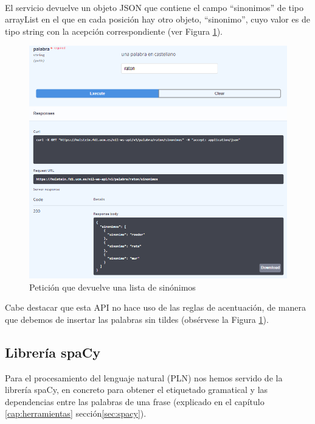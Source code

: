\begin{itemize}
\begin{lstlisting}[backgroundcolor = \color{pink},
	xleftmargin = 1cm,
	framexleftmargin = 1em,frame=tlbr,framesep=4pt,framerule=1pt]
	
\end{lstlisting}



El servicio devuelve un objeto JSON que contiene el campo ``sinonimos'' de tipo arrayList en el que en cada posición hay otro objeto, ``sinonimo'', cuyo valor es de tipo string con la acepción correspondiente (ver Figura \ref{fig:apiSinonimo}).
\begin{figure}[h!]
	\centering
	
	
	\includegraphics[scale=1]{Imagenes/Figuras/APISinonimos}
	
	
	\caption{Petición que devuelve una lista de sinónimos}
	\label{fig:apiSinonimo}
\end{figure}
\end{itemize}

Cabe destacar que esta API no hace uso de las reglas de acentuación, de manera que debemos de insertar las palabras sin tildes (obsérvese la Figura \ref{fig:apiSinonimo}).

\subsection{Librería spaCy}\label{subsec:libreriaSpacy}

Para el procesamiento del lenguaje natural (PLN) nos hemos servido de la librería spaCy, en concreto para obtener el etiquetado gramatical y las dependencias entre las palabras de una frase (explicado en el capítulo \ref{cap:herramientas} sección\ref{sec:spacy}).

